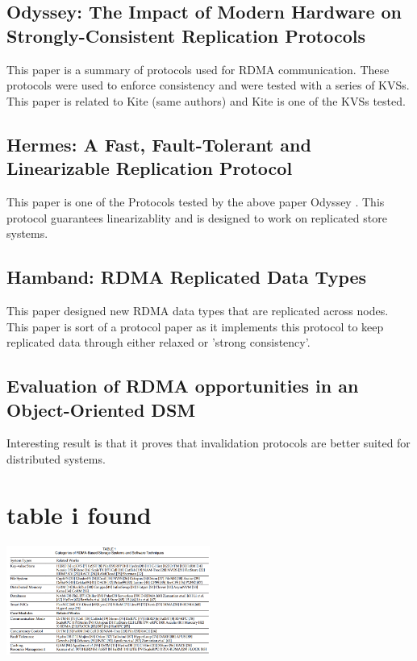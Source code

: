\documentclass[sigplan,nonacm]{acmart}
\begin{document}
    \subsection {Odyssey: The Impact of Modern Hardware on Strongly-Consistent Replication Protocols}
    This paper is a summary of protocols used for RDMA communication. These protocols were used to 
    enforce consistency and were tested with a series of KVSs. This paper is related to Kite (same authors) 
    and Kite is one of the KVSs tested.\cite{Gavrielatos-EuroSys-2021}

    \subsection {Hermes: A Fast, Fault-Tolerant and Linearizable Replication Protocol}
    This paper \cite{Katsarakis-ASPLOS-2020} is one of the Protocols tested by the above paper Odyssey \cite{Gavrielatos-EuroSys-2021}. This 
    protocol guarantees linearizablity and is designed to work on replicated store systems.

    \subsection {Hamband: RDMA Replicated Data Types}
    This paper \cite{Houshmand-PLDI-2022} designed new RDMA data types that are replicated across nodes. This paper 
    is sort of a protocol paper as it implements this protocol to keep replicated data through either relaxed or 'strong consistency'.

    \subsection{Evaluation of RDMA opportunities in an Object-Oriented DSM}
    Interesting result is that it proves that invalidation protocols are better suited 
    for distributed systems. \cite{Veldema-LCPC-2007}
\section{table i found}
\includegraphics[width=0.5\textwidth]{Table_1_A_Survey_of_Storage_Systems_in_the_RDMA_Era}
\cite{Ma-PDS-2022}
\end{document}
